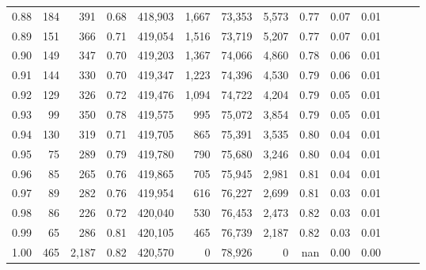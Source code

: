 \begin{tabular}{rrrrrrrrrrrrrr}
0.88 &     184 &    391 &  0.68 &  418,903 &    1,667 &  73,353 &   5,573 &  0.77 &  0.07 &      0.01 \\
0.89 &     151 &    366 &  0.71 &  419,054 &    1,516 &  73,719 &   5,207 &  0.77 &  0.07 &      0.01 \\
0.90 &     149 &    347 &  0.70 &  419,203 &    1,367 &  74,066 &   4,860 &  0.78 &  0.06 &      0.01 \\
0.91 &     144 &    330 &  0.70 &  419,347 &    1,223 &  74,396 &   4,530 &  0.79 &  0.06 &      0.01 \\
0.92 &     129 &    326 &  0.72 &  419,476 &    1,094 &  74,722 &   4,204 &  0.79 &  0.05 &      0.01 \\
0.93 &      99 &    350 &  0.78 &  419,575 &      995 &  75,072 &   3,854 &  0.79 &  0.05 &      0.01 \\
0.94 &     130 &    319 &  0.71 &  419,705 &      865 &  75,391 &   3,535 &  0.80 &  0.04 &      0.01 \\
0.95 &      75 &    289 &  0.79 &  419,780 &      790 &  75,680 &   3,246 &  0.80 &  0.04 &      0.01 \\
0.96 &      85 &    265 &  0.76 &  419,865 &      705 &  75,945 &   2,981 &  0.81 &  0.04 &      0.01 \\
0.97 &      89 &    282 &  0.76 &  419,954 &      616 &  76,227 &   2,699 &  0.81 &  0.03 &      0.01 \\
0.98 &      86 &    226 &  0.72 &  420,040 &      530 &  76,453 &   2,473 &  0.82 &  0.03 &      0.01 \\
0.99 &      65 &    286 &  0.81 &  420,105 &      465 &  76,739 &   2,187 &  0.82 &  0.03 &      0.01 \\
1.00 &     465 &  2,187 &  0.82 &  420,570 &        0 &  78,926 &       0 &   nan &  0.00 &      0.00 \\
\bottomrule
\end{tabular}
